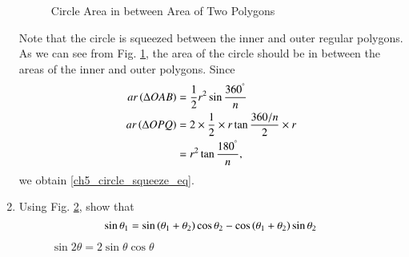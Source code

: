 \begin{enumerate}[label=\arabic*.,ref=\thesubsection.\theenumi]
\begin{figure}[!ht]
	\begin{center}
		
		\resizebox{\columnwidth}{!}{}
	\end{center}
	\caption{Circle Area in between Area of Two Polygons}
	\label{ch5_circle_squeeze}	
\end{figure}
%

\solution Note that the circle is squeezed between the inner and outer regular polygons.  As we can see from Fig. \ref{ch5_circle_squeeze}, the area of the circle should be in between the areas of the inner and outer polygons.  Since
%
\begin{align}
ar \left(\Delta OAB\right) &= \frac{1}{2}r^{2}\sin\frac{360^{\degree}}{n} \\
ar \left(\Delta OPQ\right) &= 2 \times \frac{1}{2} \times r \tan\frac{360/n}{2} \times r \\
&= r^{2}\tan\frac{180^{\degree}}{n},
\end{align}
%
we obtain \eqref{ch5_circle_squeeze_eq}.
%
%
\item
	Using Fig. \ref{ch5_sin_theta}, show that 
\begin{equation}
\label{ch5_sin_theta_eq}
\sin  \theta_1 = \sin \left(\theta_1 + \theta_2\right)\cos \theta_2 - \cos\left(\theta_1+\theta_2\right)\sin\theta_2
\end{equation}	

\begin{figure}[!ht]
	\begin{center}
		
		\resizebox{\columnwidth}{!}{}
	\end{center}
	\caption{$\sin2\theta = 2\sin\theta\cos\theta$}
	\label{ch5_sin_theta}	
\end{figure}
%


\end{enumerate}
